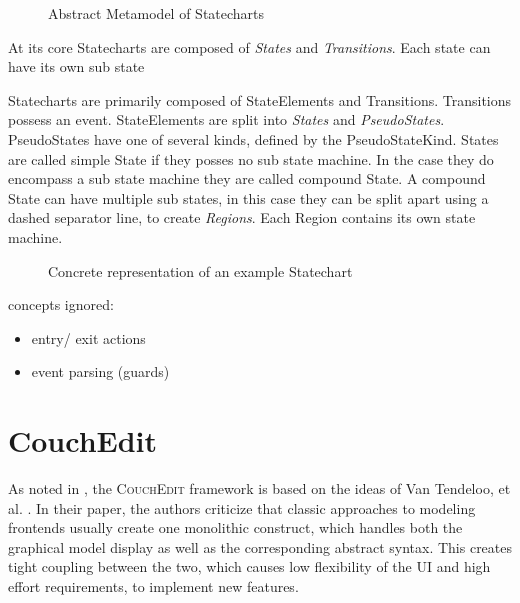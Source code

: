 \begin{figure}
\centering

\caption{Abstract Metamodel of Statecharts}
\label{fig:statechartmm}
\end{figure}

At its core Statecharts are composed of \emph{States} and \emph{Transitions}.
Each state can have its own sub state 

Statecharts are primarily composed of StateElements and Transitions. Transitions possess an event. 
StateElements are split into \emph{States} and \emph{PseudoStates}. PseudoStates have one of several kinds, defined by the PseudoStateKind. States are called simple State if they posses no sub state machine. In the case they do encompass a sub state machine they are called compound State. A compound State can have multiple sub states, in this case they can be split apart using a dashed separator line, to create \emph{Regions}. Each Region contains its own state machine.


\begin{figure}
\centering

\caption{Concrete representation of an example Statechart}
\label{fig:statechart-example}
\end{figure}

concepts ignored:
\begin{itemize}
  \item entry/ exit actions
  \item event parsing (guards)
\end{itemize}



\section{CouchEdit}
\label{sec:CouchEdit}
As noted in , the \textsc{CouchEdit} framework is based on the ideas of Van Tendeloo, et al. \cite{van_tendeloo_concrete_2017}. In their paper, the authors criticize that classic approaches to modeling frontends usually create one monolithic construct, which handles both the graphical model display as well as the corresponding abstract syntax. This creates tight coupling between the two, which causes low flexibility of the UI and high effort requirements, to implement new features. 

